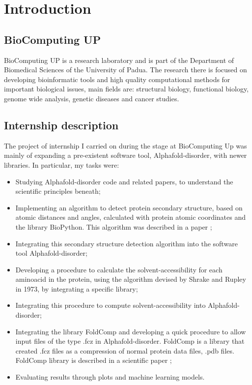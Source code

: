 \chapter{Introduction}
\label{chp:intro}

\section{BioComputing UP}
BioComputing UP is a research laboratory and is part of the Department of Biomedical Sciences of the University of Padua. The research there is focused on developing bioinformatic tools and high quality computational methods for important biological issues, main fields are: structural biology, functional biology, genome wide analysis, genetic diseases and cancer studies.
\section{Internship description}
The project of internship I carried on during the stage at BioComputing Up was mainly of expanding a pre-existent software tool, Alphafold-disorder, with newer libraries. In particular, my tasks were:
\begin{itemize}
    \item Studying Alphafold-disorder code and related papers, to understand the scientific principles beneath;
    \item Implementing an algorithm to detect protein secondary structure, based on atomic distances and angles, calculated with protein atomic coordinates and the library BioPython. This algorithm was described in a paper \cite{psea};
    \item Integrating this secondary structure detection algorithm into the software tool Alphafold-disorder;
    \item Developing a procedure to calculate the solvent-accessibility for each aminoacid in the protein, using the algorithm devised by Shrake and Rupley in 1973, by integrating a specific library;
    \item Integrating this procedure to compute solvent-accessibility into Alphafold-disorder;
    \item Integrating the library FoldComp and developing a quick procedure to allow input files of the type .fcz in Alphafold-disorder. FoldComp is a library that created .fcz files as a compression of normal protein data files, .pdb files. FoldComp library is described in a scientific paper \cite{foldcomp};
    \item Evaluating results through plots and machine learning models.
\end{itemize}

